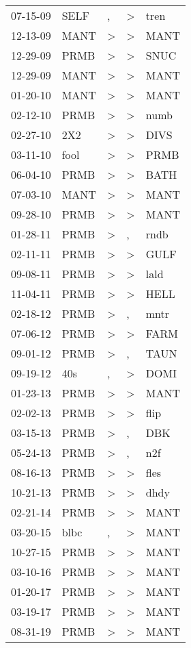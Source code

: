 \begin{supertabular}{lllll}
 07-15-09 &  SELF &             , &  \textgreater &  tren \\
 12-13-09 &  MANT &  \textgreater &  \textgreater &  MANT \\
 12-29-09 &  PRMB &  \textgreater &  \textgreater &  SNUC \\
 12-29-09 &  MANT &  \textgreater &  \textgreater &  MANT \\
 01-20-10 &  MANT &  \textgreater &  \textgreater &  MANT \\
 02-12-10 &  PRMB &  \textgreater &  \textgreater &  numb \\
 02-27-10 &   2X2 &  \textgreater &  \textgreater &  DIVS \\
 03-11-10 &  fool &  \textgreater &  \textgreater &  PRMB \\
 06-04-10 &  PRMB &  \textgreater &  \textgreater &  BATH \\
 07-03-10 &  MANT &  \textgreater &  \textgreater &  MANT \\
 09-28-10 &  PRMB &  \textgreater &  \textgreater &  MANT \\
 01-28-11 &  PRMB &  \textgreater &             , &  rndb \\
 02-11-11 &  PRMB &  \textgreater &  \textgreater &  GULF \\
 09-08-11 &  PRMB &  \textgreater &  \textgreater &  lald \\
 11-04-11 &  PRMB &  \textgreater &  \textgreater &  HELL \\
 02-18-12 &  PRMB &  \textgreater &             , &  mntr \\
 07-06-12 &  PRMB &  \textgreater &  \textgreater &  FARM \\
 09-01-12 &  PRMB &  \textgreater &             , &  TAUN \\
 09-19-12 &   40s &             , &  \textgreater &  DOMI \\
 01-23-13 &  PRMB &  \textgreater &  \textgreater &  MANT \\
 02-02-13 &  PRMB &  \textgreater &  \textgreater &  flip \\
 03-15-13 &  PRMB &  \textgreater &             , &   DBK \\
 05-24-13 &  PRMB &  \textgreater &             , &   n2f \\
 08-16-13 &  PRMB &  \textgreater &  \textgreater &  fles \\
 10-21-13 &  PRMB &  \textgreater &  \textgreater &  dhdy \\
 02-21-14 &  PRMB &  \textgreater &  \textgreater &  MANT \\
 03-20-15 &  blbc &             , &  \textgreater &  MANT \\
 10-27-15 &  PRMB &  \textgreater &  \textgreater &  MANT \\
 03-10-16 &  PRMB &  \textgreater &  \textgreater &  MANT \\
 01-20-17 &  PRMB &  \textgreater &  \textgreater &  MANT \\
 03-19-17 &  PRMB &  \textgreater &  \textgreater &  MANT \\
 08-31-19 &  PRMB &  \textgreater &  \textgreater &  MANT \\
\end{supertabular}
